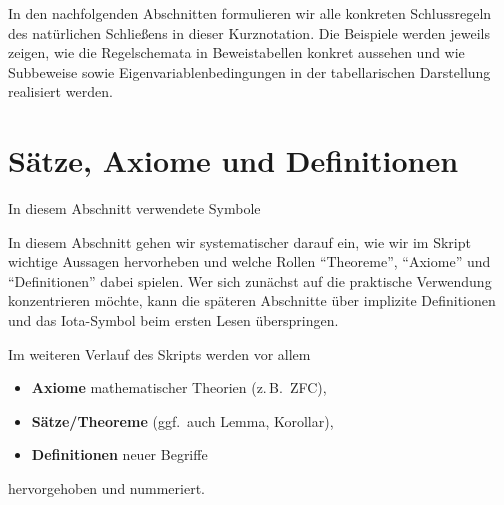 \documentclass[main.tex]{subfiles}
\begin{document}
\medskip

In den nachfolgenden Abschnitten formulieren wir alle konkreten
Schlussregeln des natürlichen Schließens in dieser Kurznotation.
Die Beispiele werden jeweils zeigen, wie die Regelschemata in
Beweistabellen konkret aussehen und wie Subbeweise sowie
Eigenvariablenbedingungen in der tabellarischen Darstellung
realisiert werden.
\section{Sätze, Axiome und Definitionen}

\begin{DeltaContext}{In diesem Abschnitt verwendete Symbole}
\end{DeltaContext}

In diesem Abschnitt gehen wir systematischer darauf ein,
wie wir im Skript wichtige Aussagen hervorheben und welche
Rollen \enquote{Theoreme}, \enquote{Axiome} und \enquote{Definitionen}
dabei spielen. Wer sich zunächst auf die praktische Verwendung
konzentrieren möchte, kann die späteren Abschnitte über implizite
Definitionen und das Iota-Symbol beim ersten Lesen überspringen.

Im weiteren Verlauf des Skripts werden vor allem
\begin{itemize}
  \item \textbf{Axiome} mathematischer Theorien (z.\,B.\ ZFC),
  \item \textbf{Sätze/Theoreme} (ggf.\ auch Lemma, Korollar),
  \item \textbf{Definitionen} neuer Begriffe
\end{itemize}
hervorgehoben und nummeriert.
\end{document}
